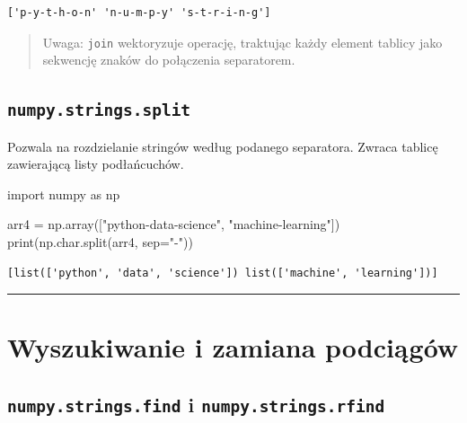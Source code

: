 \documentclass[
  letterpaper,
  DIV=11,
  numbers=noendperiod]{scrreprt}
\newenvironment{Shaded}{\begin{snugshade}}{\end{snugshade}}
\newcommand{\BuiltInTok}[1]{\textcolor[rgb]{0.00,0.23,0.31}{#1}}
\newcommand{\ImportTok}[1]{\textcolor[rgb]{0.00,0.46,0.62}{#1}}
\newcommand{\NormalTok}[1]{\textcolor[rgb]{0.00,0.23,0.31}{#1}}
\newcommand{\OperatorTok}[1]{\textcolor[rgb]{0.37,0.37,0.37}{#1}}
\newcommand{\StringTok}[1]{\textcolor[rgb]{0.13,0.47,0.30}{#1}}
\begin{document}
\begin{verbatim}
['p-y-t-h-o-n' 'n-u-m-p-y' 's-t-r-i-n-g']
\end{verbatim}

\begin{quote}
Uwaga: \texttt{join} wektoryzuje operację, traktując każdy element
tablicy jako sekwencję znaków do połączenia separatorem.
\end{quote}

\subsection{\texorpdfstring{\texttt{numpy.strings.split}}{numpy.strings.split}}\label{numpy.strings.split}

Pozwala na rozdzielanie stringów według podanego separatora. Zwraca
tablicę zawierającą listy podłańcuchów.

\begin{Shaded}
\begin{Highlighting}[]
\ImportTok{import}\NormalTok{ numpy }\ImportTok{as}\NormalTok{ np}

\NormalTok{arr4 }\OperatorTok{=}\NormalTok{ np.array([}\StringTok{"python{-}data{-}science"}\NormalTok{, }\StringTok{"machine{-}learning"}\NormalTok{])}
\BuiltInTok{print}\NormalTok{(np.char.split(arr4, sep}\OperatorTok{=}\StringTok{"{-}"}\NormalTok{))}
\end{Highlighting}
\end{Shaded}

\begin{verbatim}
[list(['python', 'data', 'science']) list(['machine', 'learning'])]
\end{verbatim}

\begin{center}\rule{0.5\linewidth}{0.5pt}\end{center}

\section{Wyszukiwanie i zamiana
podciągów}\label{wyszukiwanie-i-zamiana-podciux105guxf3w}

\subsection{\texorpdfstring{\texttt{numpy.strings.find} i
\texttt{numpy.strings.rfind}}{numpy.strings.find i numpy.strings.rfind}}\label{numpy.strings.find-i-numpy.strings.rfind}
\end{document}
